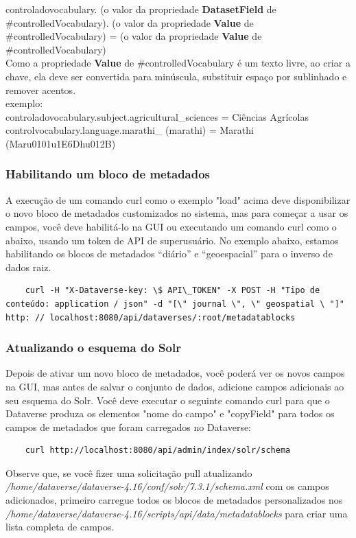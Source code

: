 \documentclass[12pt,hidelinks]{article}
\begin{document}
\qquad controladovocabulary. (o valor da propriedade \textbf{DatasetField} de \#controlledVocabulary). (o valor da propriedade \textbf{Value} de \#controlledVocabulary) = (o valor da propriedade \textbf{Value} de \#controlledVocabulary)\\

Como a propriedade \textbf{Value} de \#controlledVocabulary é um texto livre, ao criar a chave, ela deve ser convertida para minúscula, substituir espaço por sublinhado e remover acentos.\\

exemplo:\\

controladovocabulary.subject.agricultural\_sciences = Ciências Agrícolas\\

controlvocabulary.language.marathi\_ (marathi) = Marathi (Maru0101u1E6Dhu012B)\\

\subsubsection{Habilitando um bloco de metadados}

\qquad A execução de um comando curl como o exemplo "load" acima deve disponibilizar o novo bloco de metadados customizados no sistema, mas para começar a usar os campos, você deve habilitá-lo na GUI ou executando um comando curl como o abaixo, usando um token de API de superusuário. No exemplo abaixo, estamos habilitando os blocos de metadados “diário” e “geoespacial” para o inverso de dados raiz.

\begin{verbatim}
    curl -H "X-Dataverse-key: \$ API\_TOKEN" -X POST -H "Tipo de conteúdo: application / json" -d "[\" journal \", \" geospatial \ "]" http: // localhost:8080/api/dataverses/:root/metadatablocks
\end{verbatim}

\subsubsection{Atualizando o esquema do Solr}

\qquad Depois de ativar um novo bloco de metadados, você poderá ver os novos campos na GUI, mas antes de salvar o conjunto de dados, adicione campos adicionais ao seu esquema do Solr. Você deve executar o seguinte comando curl para que o Dataverse produza os elementos "nome do campo" e "copyField" para todos os campos de metadados que foram carregados no Dataverse:\\
\begin{verbatim}
    curl http://localhost:8080/api/admin/index/solr/schema
\end{verbatim}
Observe que, se você fizer uma solicitação pull atualizando \textit{/home/dataverse/dataverse-4.16/conf/solr/7.3.1/schema.xml} com os campos adicionados, primeiro carregue todos os blocos de metadados personalizados nos \textit{/home/dataverse/dataverse-4.16/scripts/api/data/metadatablocks} para criar uma lista completa de campos.
\end{document}
